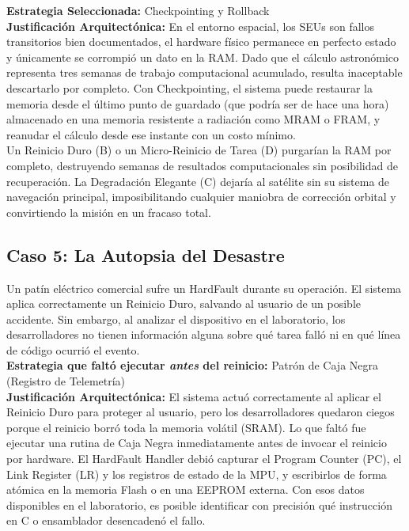 \documentclass[12pt,letterpaper]{article}
\begin{document}
\textbf{Estrategia Seleccionada:} Checkpointing y Rollback\\
 
\textbf{Justificación Arquitectónica:} En el entorno espacial, los SEUs son fallos transitorios bien
documentados, el hardware físico permanece en perfecto estado y únicamente se corrompió un dato en la RAM. Dado
que el cálculo astronómico representa tres semanas de trabajo computacional acumulado, resulta inaceptable
descartarlo por completo. Con Checkpointing, el sistema puede restaurar la memoria desde el último punto de
guardado (que podría ser de hace una hora) almacenado en una memoria resistente a radiación como MRAM o FRAM,
y reanudar el cálculo desde ese instante con un costo mínimo.\\
 
Un Reinicio Duro (B) o un Micro-Reinicio de Tarea (D) purgarían la RAM por completo, destruyendo semanas de
resultados computacionales sin posibilidad de recuperación. La Degradación Elegante (C) dejaría al satélite sin
su sistema de navegación principal, imposibilitando cualquier maniobra de corrección orbital y convirtiendo la
misión en un fracaso total.
 
\subsection*{Caso 5: La Autopsia del Desastre}
Un patín eléctrico comercial sufre un HardFault durante su operación. El sistema aplica correctamente un
Reinicio Duro, salvando al usuario de un posible accidente. Sin embargo, al analizar el dispositivo en el
laboratorio, los desarrolladores no tienen información alguna sobre qué tarea falló ni en qué línea de código
ocurrió el evento.\\

\textbf{Estrategia que faltó ejecutar \textit{antes} del reinicio:} Patrón de Caja Negra
(Registro de Telemetría)\\
 
\textbf{Justificación Arquitectónica:} El sistema actuó correctamente al aplicar el Reinicio Duro para proteger
al usuario, pero los desarrolladores quedaron ciegos porque el reinicio borró toda la memoria volátil (SRAM).
Lo que faltó fue ejecutar una rutina de Caja Negra inmediatamente antes de invocar el reinicio por hardware.
El HardFault Handler debió capturar el Program Counter (PC), el Link Register (LR) y los registros de estado de
la MPU, y escribirlos de forma atómica en la memoria Flash o en una EEPROM externa. Con esos datos disponibles
en el laboratorio, es posible identificar con precisión qué instrucción en C o ensamblador desencadenó el fallo.\\
 
\end{document}
